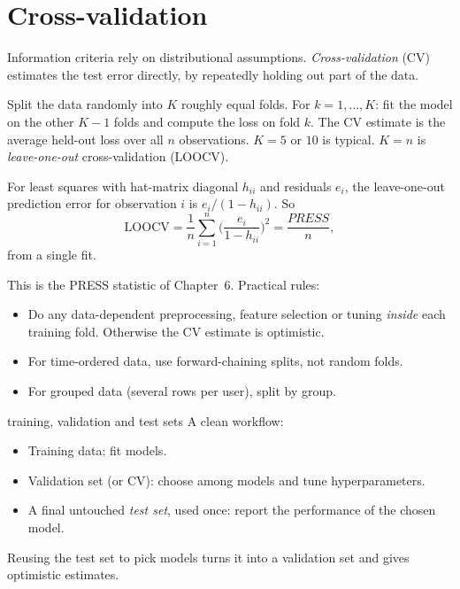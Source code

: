\section{Cross-validation}

Information criteria rely on distributional assumptions. \emph{Cross-validation} (CV) estimates the test error directly, by repeatedly holding out part of the data.

\begin{definition}
Split the data randomly into $K$ roughly equal folds. For $k=1,\dots,K$: fit the model on the other $K-1$ folds and compute the loss on fold $k$. The CV estimate is the average held-out loss over all $n$ observations. $K=5$ or $10$ is typical. $K=n$ is \emph{leave-one-out} cross-validation (LOOCV).
\end{definition}

\begin{theorem}\label{thm:loocv}
For least squares with hat-matrix diagonal $h_{ii}$ and residuals $e_i$, the leave-one-out prediction error for observation $i$ is $e_i/(1-h_{ii})$. So
\[ \mathrm{LOOCV}=\frac1n\sum_{i=1}^n\Big(\frac{e_i}{1-h_{ii}}\Big)^2=\frac{PRESS}n, \]
from a single fit.
\end{theorem}

This is the PRESS statistic of Chapter~6. Practical rules:
\begin{itemize}
  \item Do any data-dependent preprocessing, feature selection or tuning \emph{inside} each training fold. Otherwise the CV estimate is optimistic.
  \item For time-ordered data, use forward-chaining splits, not random folds.
  \item For grouped data (several rows per user), split by group.
\end{itemize}

\begin{interview}{training, validation and test sets}
A clean workflow:
\begin{itemize}
  \item Training data: fit models.
  \item Validation set (or CV): choose among models and tune hyperparameters.
  \item A final untouched \emph{test set}, used once: report the performance of the chosen model.
\end{itemize}
Reusing the test set to pick models turns it into a validation set and gives optimistic estimates.
\end{interview}

